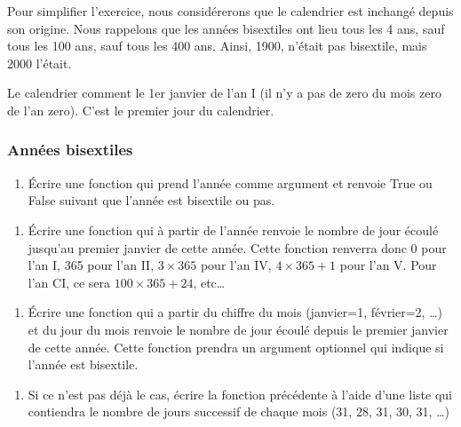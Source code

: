 \documentclass[letterpaper,10pt,english]{sphinxhowto}
\begin{document}
\sphinxAtStartPar
Pour simplifier l’exercice, nous considérerons que le calendrier est inchangé depuis son origine. Nous rappelons que les années bisextiles ont lieu tous les 4 ans, sauf tous les 100 ans, sauf tous les 400 ans. Ainsi, 1900, n’était pas bisextile, mais 2000 l’était.

\sphinxAtStartPar
Le calendrier comment le 1er janvier de l’an I (il n’y a pas de zero du mois zero de l’an zero). C’est le premier jour du calendrier.


\subsubsection{Années bisextiles}
\label{\detokenize{devoir_maison_Devoir Maison:annees-bisextiles}}\begin{enumerate}
%
\item {} 
\sphinxAtStartPar
Écrire une fonction qui prend l’année comme argument et renvoie True ou False suivant que l’année est bisextile ou pas.

\end{enumerate}
\begin{enumerate}
%
\setcounter{enumi}{1}
\item {} 
\sphinxAtStartPar
Écrire une fonction qui à partir de l’année renvoie le nombre de jour écoulé jusqu’au premier janvier de cette année. Cette fonction renverra donc 0 pour l’an I, 365 pour l’an II, \(3\times365\) pour l’an IV, \(4\times365+1\) pour l’an V. Pour l’an CI, ce sera \(100\times 365 + 24\), etc…

\end{enumerate}
\begin{enumerate}
%
\setcounter{enumi}{2}
\item {} 
\sphinxAtStartPar
Écrire une fonction qui a partir du chiffre du mois (janvier=1, février=2, …) et du jour du mois renvoie le nombre de jour écoulé depuis le premier janvier de cette année. Cette fonction prendra un argument optionnel qui indique si l’année est bisextile.

\end{enumerate}
\begin{enumerate}
%
\setcounter{enumi}{3}
\item {} 
\sphinxAtStartPar
Si ce n’est pas déjà le cas, écrire la fonction précédente à l’aide d’une liste qui contiendra le nombre de jours successif de chaque mois (31, 28, 31, 30, 31, …)

\end{enumerate}
\end{document}
